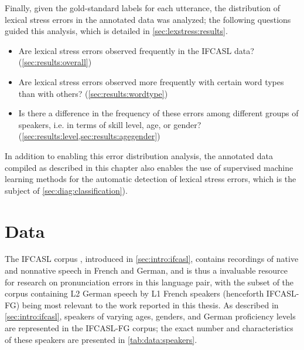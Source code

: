 	Finally, given the gold-standard labels for each utterance, the distribution of lexical stress errors in the annotated data was analyzed; the following questions guided this analysis, which is detailed in \cref{sec:lexstress:results}.
	\begin{itemize}[topsep=-1em]
	\item{Are lexical stress errors observed frequently in the IFCASL data? (\cref{sec:results:overall})}
		\item{Are lexical stress errors observed more frequently with certain word types than with others?  (\cref{sec:results:wordtype})}
	\item{Is there a difference in the frequency of these errors among different groups of speakers, i.e. in terms of skill level, age, or gender? (\cref{sec:results:level,sec:results:agegender})}
	\end{itemize}
	In addition to enabling this error distribution analysis, the annotated data compiled as described in this chapter also enables the use of supervised machine learning methods for the automatic detection of lexical stress errors, which is the subject of \cref{sec:diag:classification}).
	
	\section{Data}
	\label{sec:lexstress:data}
	
	The IFCASL corpus \citep{Trouvain2013,Fauth2014}, introduced in \cref{sec:intro:ifcasl}, contains recordings of native and nonnative speech in French and German, and is thus a invaluable resource for research on pronunciation errors in this language pair, with the subset of the corpus containing L2 German speech by L1 French speakers (henceforth IFCASL-FG) being most relevant to the work reported in this thesis. As described in \cref{sec:intro:ifcasl}, speakers of varying ages, genders, and German proficiency levels are represented in the IFCASL-FG corpus; the exact number and characteristics of these speakers are presented in \cref{tab:data:speakers}.
	

